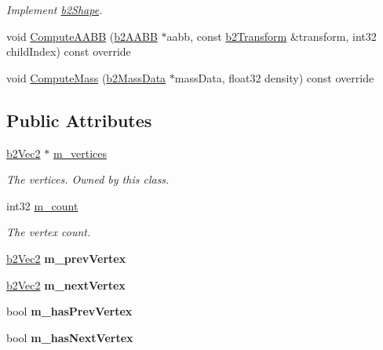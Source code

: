 \begin{DoxyCompactItemize}
\begin{DoxyCompactList}\small\item\em Implement \hyperlink{classb2Shape}{b2\+Shape}. \end{DoxyCompactList}\item 
void \hyperlink{classb2ChainShape_ae1d7470ce8d32e92d27c149ab45f5468}{Compute\+A\+A\+BB} (\hyperlink{structb2AABB}{b2\+A\+A\+BB} $\ast$aabb, const \hyperlink{structb2Transform}{b2\+Transform} \&transform, int32 child\+Index) const override
\item 
void \hyperlink{classb2ChainShape_aad3671d6eab61f6b26e2f1b6ac50bb98}{Compute\+Mass} (\hyperlink{structb2MassData}{b2\+Mass\+Data} $\ast$mass\+Data, float32 density) const override
\end{DoxyCompactItemize}
\subsection*{Public Attributes}
\begin{DoxyCompactItemize}
\item 
\mbox{\label{classb2ChainShape_a9c3c4097d34a7fe0d3f0220963df97a0}} 
\hyperlink{structb2Vec2}{b2\+Vec2} $\ast$ \hyperlink{classb2ChainShape_a9c3c4097d34a7fe0d3f0220963df97a0}{m\+\_\+vertices}
\begin{DoxyCompactList}\small\item\em The vertices. Owned by this class. \end{DoxyCompactList}\item 
\mbox{\label{classb2ChainShape_ab2ad711781e6ac81179074e90e0e058b}} 
int32 \hyperlink{classb2ChainShape_ab2ad711781e6ac81179074e90e0e058b}{m\+\_\+count}
\begin{DoxyCompactList}\small\item\em The vertex count. \end{DoxyCompactList}\item 
\mbox{\label{classb2ChainShape_a3a42d4c6b2421bc5badda3b6164949cf}} 
\hyperlink{structb2Vec2}{b2\+Vec2} {\bfseries m\+\_\+prev\+Vertex}
\item 
\mbox{\label{classb2ChainShape_af3716ef780dd5bcd905e350d8854aaa2}} 
\hyperlink{structb2Vec2}{b2\+Vec2} {\bfseries m\+\_\+next\+Vertex}
\item 
\mbox{\label{classb2ChainShape_a8a6ffbb9de0e2b8545c8b4fc8aa77249}} 
bool {\bfseries m\+\_\+has\+Prev\+Vertex}
\item 
\mbox{\label{classb2ChainShape_a333b74486566e73c3cf1f7da5e69a96e}} 
bool {\bfseries m\+\_\+has\+Next\+Vertex}
\end{DoxyCompactItemize}
